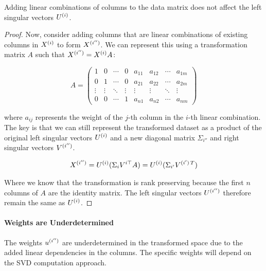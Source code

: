 \begin{lemma}
    Adding linear combinations of columns to the data matrix does not affect the left singular vectors $U^{(i)}$.
\end{lemma}

\begin{proof}
    Now, consider adding columns that are linear combinations of existing columns in \( X^{(i)} \) to form \( X^{(i'')} \).
    We can represent this using a transformation matrix \( A \) such that \( X^{(i'')} = X^{(i)}A \):

    \begin{equation}
        A = \begin{pmatrix}
                1      & 0      & \cdots & 0      & a_{11} & a_{12} & \cdots & a_{1m} \\
                0      & 1      & \cdots & 0      & a_{21} & a_{22} & \cdots & a_{2m} \\
                \vdots & \vdots & \ddots & \vdots & \vdots & \vdots & \ddots & \vdots \\
                0      & 0      & \cdots & 1      & a_{n1} & a_{n2} & \cdots & a_{nm}
        \end{pmatrix}
    \end{equation}

    where \( a_{ij} \) represents the weight of the \( j \)-th column in the \( i \)-th linear combination.
    The key is that we can still represent the transformed dataset as a product of the original left singular vectors \( U^{(i)} \) and a new diagonal matrix \( \Sigma_{i''} \) and right singular vectors \( V^{(i'')} \).

    \begin{align}
        X^{(i'')} = U^{(i)}(\Sigma_{i}V^{i\top}A) = U^{(i)}(\Sigma_{i'}V^{(i')\,T})  \label{eq:svd_linear_combinations}
    \end{align}

    Where we know that the transformation is rank preserving because the first \( n \) columns of \( A \) are the identity matrix.
    The left singular vectors \( U^{(i'')} \) therefore remain the same as \( U^{(i)} \).
\end{proof}

\paragraph{Weights are Underdetermined}
The weights \( u^{(i'')} \) are underdetermined in the transformed space due to the added linear dependencies in the columns. The specific weights will depend on the SVD computation approach.

